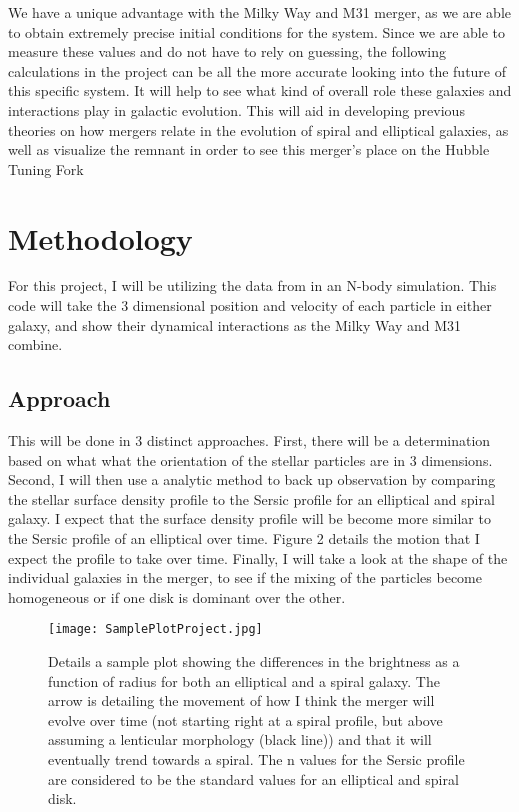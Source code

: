 \documentclass{aastex63}
\begin{document}
\medskip
We have a unique advantage with the Milky Way and M31 merger, as we are able to obtain extremely precise initial conditions for the system. Since we are able to measure these values and do not have to rely on guessing, the following calculations in the project can be all the more accurate looking into the future of this specific system. It will help to see what kind of overall role these galaxies and interactions play in galactic evolution. This will aid in developing previous theories on how mergers relate in the evolution of spiral and elliptical galaxies, as well as visualize the remnant in order to see this merger's place on the Hubble Tuning Fork

\section{Methodology}

For this project, I will be utilizing the data from \cite{2012ApJ...753....9V} in an N-body simulation. This code will take the 3 dimensional position and velocity of each particle in either galaxy, and show their dynamical interactions as the Milky Way and M31 combine.

\subsection{Approach}

 This will be done in 3 distinct approaches. First, there will be a determination based on what what the orientation of the stellar particles are in 3 dimensions. Second, I will then use a analytic method to back up observation by comparing the stellar surface density profile to the Sersic profile for an elliptical and spiral galaxy. I expect that the surface density profile will be become more similar to the Sersic profile of an elliptical over time. Figure 2 details the motion that I expect the profile to take over time. Finally, I will take a look at the shape of the individual galaxies in the merger, to see if the mixing of the particles become homogeneous or if one disk is dominant over the other. 
 
 \begin{figure}
    \centering
    \texttt{[image: SamplePlotProject.jpg]}
    \caption{Details a sample plot showing the differences in the brightness as a function of radius for both an elliptical and a spiral galaxy. The arrow is detailing the movement of how I think the merger will evolve over time (not starting right at a spiral profile, but above assuming a lenticular morphology (black line)) and that it will eventually trend towards a spiral. The n values for the Sersic profile are considered to be the standard values for an elliptical and spiral disk.}
    \label{fig:Sample}
\end{figure}
\end{document}
